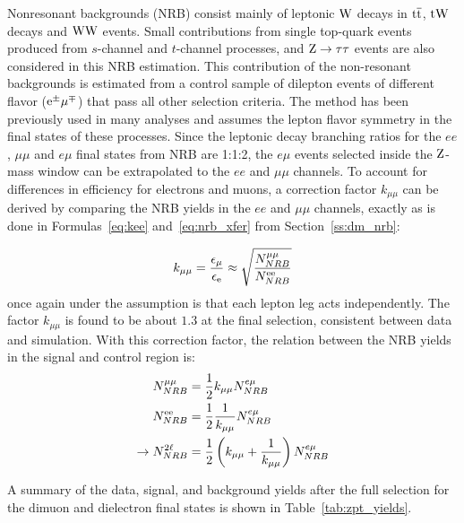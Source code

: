 Nonresonant backgrounds (NRB) consist mainly 
 of leptonic $\mathrm{W}$ decays in ${\mathrm{t}\overline{\mathrm{t}}}$, $\mathrm{t}\mathrm{W}$ decays and $\mathrm{W}\mathrm{W}$ events. 
 Small contributions from single top-quark events produced from
$s$-channel and $t$-channel processes, and $\mathrm{Z}\rightarrow \mathrm{\tau}\mathrm{\tau}$
events are also considered in this NRB estimation. 
This contribution of the non-resonant backgrounds is estimated from a control
sample of dilepton events of different flavor ($\mathrm{e}^{\pm}\mathrm{\mu}^{\mp}$) 
that pass all other selection criteria.
The method has been previously used in many analyses and assumes the lepton flavor symmetry in the final states of these processes.
Since the leptonic decay branching ratios for the $ee$, $\mu\mu$ and $e\mu$ final states from NRB are 1:1:2,
the $e\mu$ events selected inside the $\mathrm{Z}$-mass window can be extrapolated to the $ee$ and $\mu\mu$ channels.
To account for differences in efficiency for electrons and muons, 
a correction factor $k_{\mu\mu}$ can be derived by comparing the NRB yields in the $ee$ and $\mu\mu$ channels,
exactly as is done in Formulas~\ref{eq:kee} and~\ref{eq:nrb_xfer} from Section~\ref{ss:dm_nrb}:

\begin{equation}
k_{\mu\mu} = \frac{\epsilon_\mu}{\epsilon_{\mathrm{e}}} \approx \sqrt{\frac{N^{\mu\mu}_{NRB}}{N^{\mathrm{e}\mathrm{e}}_{NRB}}}
\end{equation}
once again under the assumption is that each lepton leg acts independently.
The factor $k_{\mu\mu}$ is found to be about $1.3$ at the final selection, 
consistent between data and simulation. 
With this correction factor, the relation between the NRB yields in the signal and control region is:
\begin{equation}
\begin{split}
  N^{\mu\mu}_{NRB}     &= \frac{1}{2} k_{\mu\mu} N^{e\mu}_{NRB} \\
  N^{\mathrm{e}\mathrm{e}}_{NRB} &= \frac{1}{2} \frac{1}{k_{\mu\mu}} N^{e\mu}_{NRB} \\
\rightarrow N^{2\ell}_{NRB}  &= \frac{1}{2} \left( k_{\mu\mu} + \frac{1}{k_{\mu\mu}} \right) N^{e\mu}_{NRB}
\end{split}
\end{equation}

A summary of the data, signal, and background yields after the full selection for the dimuon and dielectron 
final states is shown in Table~\ref{tab:zpt_yields}.

